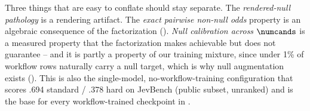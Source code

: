 Three things that are easy to conflate should stay separate. The \emph{rendered-null pathology} is a
rendering artifact. The \emph{exact pairwise non-null odds} property is an algebraic consequence of the
factorization (). \emph{Null calibration across $\numcands$} is a measured
property that the factorization makes achievable but does not guarantee -- and it is partly a property
of our training mixture, since under 1\% of workflow rows naturally carry a null target, which is why
null augmentation exists (). This is also the single-model, no-workflow-training
configuration that scores .694 standard / .378 hard on JevBench (public subset, unranked) and is the
base for every workflow-trained checkpoint in .
